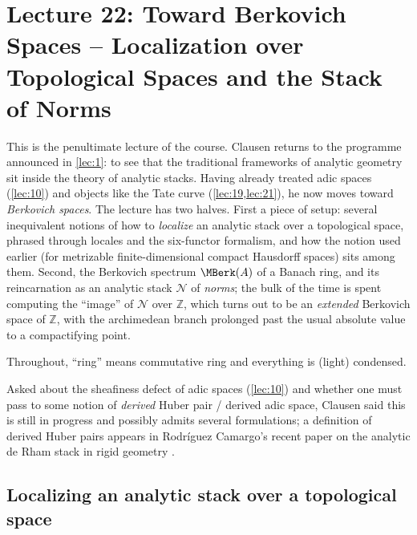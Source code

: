 \section{Lecture 22: Toward Berkovich Spaces -- Localization over
Topological Spaces and the Stack of Norms}
\label{lec:22}

This is the penultimate lecture of the course. Clausen returns to the
programme announced in \cref{lec:1}: to see that the traditional frameworks of
analytic geometry sit inside the theory of analytic stacks. Having already
treated adic spaces (\cref{lec:10}) and objects like the Tate curve
(\cref{lec:19,lec:21}), he now moves toward \emph{Berkovich spaces}. The
lecture has two halves. First a piece of setup: several inequivalent notions of
how to \emph{localize} an analytic stack over a topological space, phrased
through locales and the six-functor formalism, and how the notion used earlier
(for metrizable finite-dimensional compact Hausdorff spaces) sits among them.
Second, the Berkovich spectrum $\MBerk(A)$ of a Banach ring, and its
reincarnation as an analytic stack $\mathcal N$ of \emph{norms}; the bulk of the
time is spent computing the ``image'' of $\mathcal N$ over $\mathbb Z$, which
turns out to be an \emph{extended} Berkovich space of $\mathbb Z$, with the
archimedean branch prolonged past the usual absolute value to a compactifying
point.

Throughout, ``ring'' means commutative ring and everything is (light)
condensed.

\begin{remark}
\label{rmk:22:derived-huber}
Asked about the sheafiness defect of adic spaces (\cref{lec:10}) and whether one
must pass to some notion of \emph{derived} Huber pair / derived adic space,
Clausen said this is still in progress and possibly admits several
formulations; a definition of derived Huber pairs appears in Rodr\'iguez
Camargo's recent paper on the analytic de Rham stack in rigid geometry
\cite{camargo2024analyticrhamstackrigid}.
\end{remark}

\subsection{Localizing an analytic stack over a topological space}
\label{subsec:22:localization}

